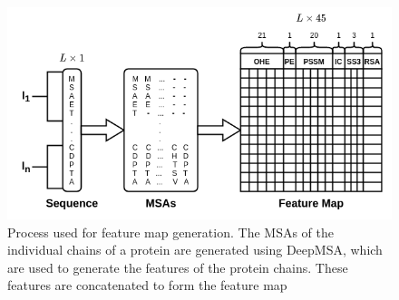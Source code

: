 \documentclass[journal=jacsat,manuscript=article]{achemso}
\begin{document}
\begin{figure}
    \centering
    \noindent\includegraphics[scale=0.6]{feature_map}
    \caption{\centering Process used for feature map generation. The MSAs of the individual chains of a protein are generated using DeepMSA, which are used to generate the features of the protein chains. These features are concatenated to form the feature map}
    \label{fig:feature_map}
\end{figure}




\end{document}

